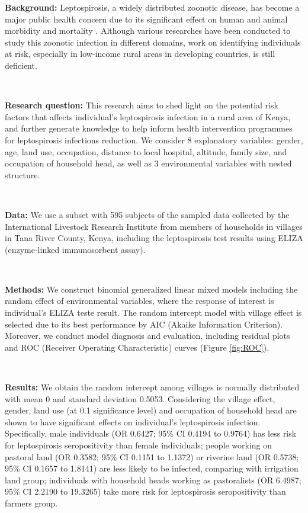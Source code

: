 \documentclass[11pt,twoside]{article}
\numberwithin{Theorem}{section}
\numberwithin{Definition}{section}
\numberwithin{Lemma}{section}
\numberwithin{Algorithm}{section}
\numberwithin{equation}{section}
\begin{document}
\textbf{Background:} Leptospirosis, a widely distributed zoonotic disease, has become a major public health concern due to its significant effect on human and animal morbidity and mortality \cite{haake2015leptospirosis}. Although various researches have been conducted to study this zoonotic infection in different domains, work on identifying individuals at risk, especially in low-income rural areas in developing countries, is still deficient.

\

\textbf{Research question:} This research aims to shed light on the potential risk factors that affects individual's leptospirosis infection in a rural area of Kenya, and further generate knowledge to help inform health intervention programmes for leptospirosis infections reduction. We consider 8 explanatory variables: gender, age, land use, occupation, distance to local hospital, altitude, family size, and occupation of household head, as well as 3 environmental variables with nested structure.

\

\textbf{Data:} We use a subset with 595 subjects of the sampled data collected by the International Livestock Research Institute from members of households in villages in Tana River County, Kenya, including the leptospirosis test results using ELIZA (enzyme-linked immunosorbent assay). 


\

\textbf{Methods:} We construct binomial generalized linear mixed models including the random effect of environmental variables, where the response of interest is individual's ELIZA teste result. The random intercept model with village effect is selected due to its best performance by AIC (Akaike Information Criterion). Moreover, we conduct model diagnosis and evaluation, including residual plots and ROC (Receiver Operating Characteristic) curves (Figure \ref{fig:ROC}). 

\

\textbf{Results:} We obtain the random intercept among villages is normally distributed with mean 0 and standard deviation 0.5053. Considering the village effect, gender, land use (at 0.1 significance level) and occupation of household head are shown to have significant effects on individual's leptospirosis infection. Specifically, male individuals (OR 0.6427; 95\% CI 0.4194 to 0.9764) has less risk for leptospirosis seropositivity than female individuals; people working on pastoral land (OR 0.3582; 95\% CI 0.1151 to 1.1372) or riverine land (OR 0.5738; 95\% CI 0.1657 to 1.8141) are less likely to be infected, comparing with irrigation land group; individuals with household heads working as pastoralists (OR 6.4987; 95\% CI 2.2190 to 19.3265) take more risk for leptospirosis seropositivity than farmers group.
\end{document}
